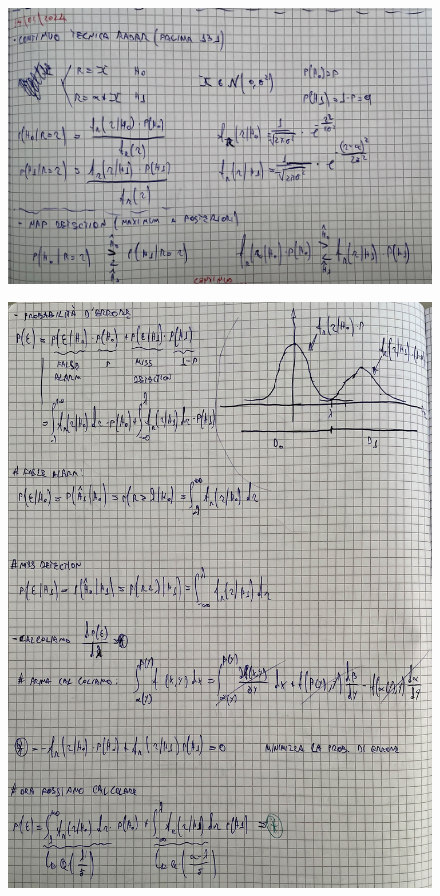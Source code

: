 \documentclass{article}
\begin{document}
\begin{figure}[H]
\centering
\includegraphics[scale=0.10]{ese/24c.jpeg}
\end{figure} 
\begin{figure}[H]
\centering
\includegraphics[scale=0.10]{ese/24d.jpeg}
\end{figure} 
\end{document}
